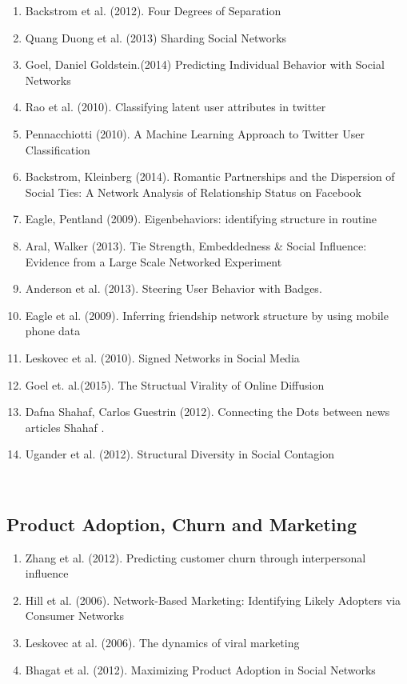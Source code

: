 \begin{enumerate}  
\item Backstrom et al. (2012). Four Degrees of Separation \cite{Backstrom:2012:FDS:2380718.2380723}
\item  Quang Duong et al. (2013)  Sharding Social Networks\cite{Duong_2013}   
\item  Goel, Daniel  Goldstein.(2014)  Predicting Individual Behavior with Social Networks \cite{Goel_2014} 
\item Rao et al. (2010). Classifying latent user attributes in twitter\cite{Rao_2010}
\item Pennacchiotti (2010). A Machine Learning Approach to Twitter User Classification\cite{pennacchiotti2011machine}
\item Backstrom, Kleinberg (2014). Romantic Partnerships and the Dispersion of Social Ties: A Network Analysis of Relationship Status on Facebook\cite{Backstrom_2014}
\item Eagle, Pentland (2009). Eigenbehaviors: identifying structure in routine\cite{Eagle_2009}
\item Aral, Walker (2013). Tie Strength, Embeddedness & Social Influence: Evidence from a Large Scale Networked Experiment \cite{Aral}
\item Anderson et al. (2013). Steering User Behavior with Badges. \cite{Anderson:2013:SUB:2488388.2488398}
\item Eagle et al. (2009). Inferring friendship network structure by using mobile phone data \cite{Eagle_2009}
\item Leskovec et al. (2010). Signed Networks in Social Media \cite{Leskovec_2010}

\item  Goel et.  al.(2015).  The Structual Virality of Online Diffusion\cite{Goel_2015}  
\item  Dafna Shahaf, Carlos Guestrin (2012). Connecting the Dots between news articles Shahaf  . \cite{Shahaf:2012:CTD:2086737.2086744} 
\item Ugander et al. (2012). Structural Diversity in Social Contagion \cite{Ugander_2012}
\end{enumerate}  
\\  

\subsection{Product Adoption, Churn and Marketing}  
\begin{enumerate}  
\item Zhang et al. (2012). Predicting customer churn through interpersonal inﬂuence \cite{Zhang_2012}
\item Hill et al. (2006).  Network-Based Marketing: Identifying Likely Adopters via Consumer Networks\cite{Hill_2006}  
\item Leskovec at al. (2006). The dynamics of viral marketing \cite{Leskovec:2007:DVM:1232722.1232727}  
\item Bhagat et al. (2012). Maximizing Product Adoption in Social Networks\cite{Bhagat:2012:MPA:2124295.2124368} 
\end{enumerate} 